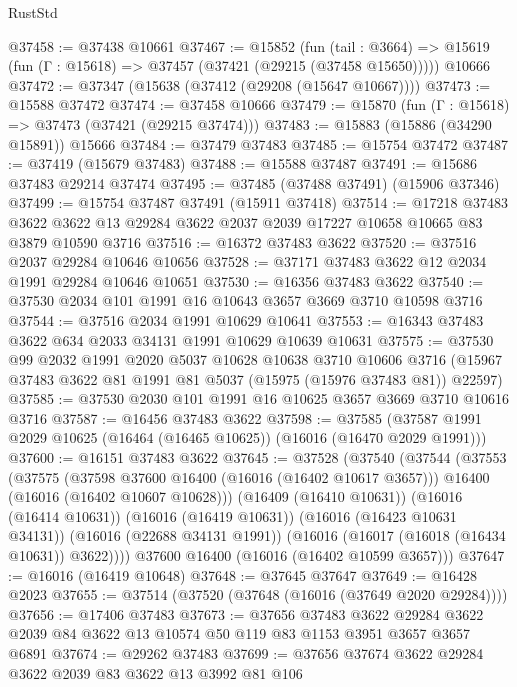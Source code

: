 \begin{lexlean}{RustStd}
\begin{coremodule}
@37458 := @37438 @10661
@37467 := @15852
    (fun (tail : @3664) => @15619 (fun (Γ : @15618) => @37457 (@37421 (@29215 (@37458 @15650)))))
    @10666
@37472 := @37347 (@15638 (@37412 (@29208 (@15647 @10667))))
@37473 := @15588 @37472
@37474 := @37458 @10666
@37479 := @15870 (fun (Γ : @15618) => @37473 (@37421 (@29215 @37474)))
@37483 := @15883 (@15886 (@34290 @15891)) @15666
@37484 := @37479 @37483
@37485 := @15754 @37472
@37487 := @37419 (@15679 @37483)
@37488 := @15588 @37487
@37491 := @15686 @37483 @29214 @37474
@37495 := @37485 (@37488 @37491) (@15906 @37346)
@37499 := @15754 @37487 @37491 (@15911 @37418)
@37514 := @17218
    @37483
    @3622
    @3622
    @13
    @29284
    @3622
    @2037
    @2039
    @17227
    @10658
    @10665
    @83
    @3879
    @10590
    @3716
@37516 := @16372 @37483 @3622
@37520 := @37516 @2037 @29284 @10646 @10656
@37528 := @37171 @37483 @3622 @12 @2034 @1991 @29284 @10646 @10651
@37530 := @16356 @37483 @3622
@37540 := @37530 @2034 @101 @1991 @16 @10643 @3657 @3669 @3710 @10598 @3716
@37544 := @37516 @2034 @1991 @10629 @10641
@37553 := @16343 @37483 @3622 @634 @2033 @34131 @1991 @10629 @10639 @10631
@37575 := @37530
    @99
    @2032
    @1991
    @2020
    @5037
    @10628
    @10638
    @3710
    @10606
    @3716
    (@15967 @37483 @3622 @81 @1991 @81 @5037 (@15975 (@15976 @37483 @81)) @22597)
@37585 := @37530 @2030 @101 @1991 @16 @10625 @3657 @3669 @3710 @10616 @3716
@37587 := @16456 @37483 @3622
@37598 := @37585 (@37587 @1991 @2029 @10625 (@16464 (@16465 @10625)) (@16016 (@16470 @2029 @1991)))
@37600 := @16151 @37483 @3622
@37645 := @37528
    (@37540
      (@37544
        (@37553
          (@37575
            (@37598 @37600 @16400 (@16016 (@16402 @10617 @3657)))
            @16400
            (@16016 (@16402 @10607 @10628)))
          (@16409 (@16410 @10631))
          (@16016 (@16414 @10631))
          (@16016 (@16419 @10631))
          (@16016 (@16423 @10631 @34131))
          (@16016 (@22688 @34131 @1991))
          (@16016 (@16017 (@16018 (@16434 @10631)) @3622))))
      @37600
      @16400
      (@16016 (@16402 @10599 @3657)))
@37647 := @16016 (@16419 @10648)
@37648 := @37645 @37647
@37649 := @16428 @2023
@37655 := @37514 (@37520 (@37648 (@16016 (@37649 @2020 @29284))))
@37656 := @17406 @37483
@37673 := @37656
    @37483
    @3622
    @29284
    @3622
    @2039
    @84
    @3622
    @13
    @10574
    @50
    @119
    @83
    @1153
    @3951
    @3657
    @3657
    @6891
@37674 := @29262 @37483
@37699 := @37656
    @37674
    @3622
    @29284
    @3622
    @2039
    @83
    @3622
    @13
    @3992
    @81
    @106

\end{coremodule}
\end{lexlean}
